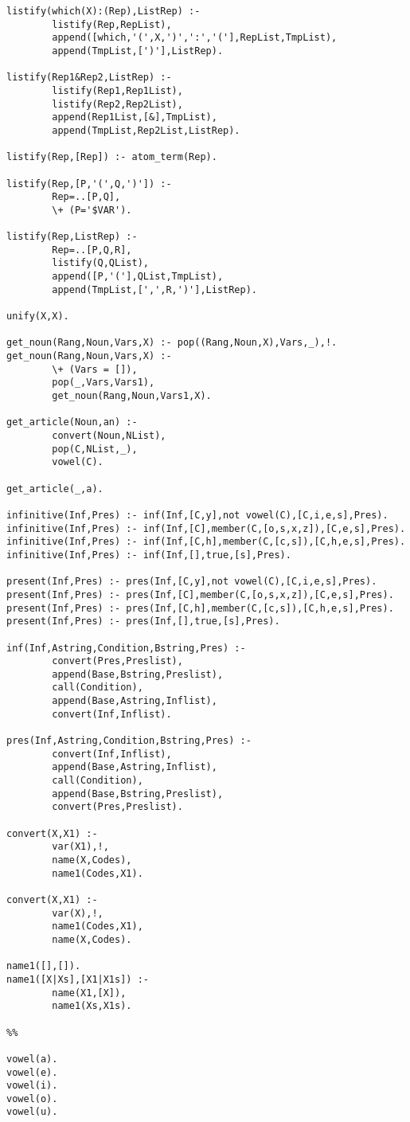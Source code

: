 \begin{verbatim}
listify(which(X):(Rep),ListRep) :-
        listify(Rep,RepList),
        append([which,'(',X,')',':','('],RepList,TmpList),
        append(TmpList,[')'],ListRep).

listify(Rep1&Rep2,ListRep) :-
        listify(Rep1,Rep1List),
        listify(Rep2,Rep2List),
        append(Rep1List,[&],TmpList),
        append(TmpList,Rep2List,ListRep).

listify(Rep,[Rep]) :- atom_term(Rep).

listify(Rep,[P,'(',Q,')']) :- 
        Rep=..[P,Q],
        \+ (P='$VAR').

listify(Rep,ListRep) :-
        Rep=..[P,Q,R],
        listify(Q,QList),
        append([P,'('],QList,TmpList),
        append(TmpList,[',',R,')'],ListRep).

unify(X,X).

get_noun(Rang,Noun,Vars,X) :- pop((Rang,Noun,X),Vars,_),!.
get_noun(Rang,Noun,Vars,X) :-
        \+ (Vars = []),
        pop(_,Vars,Vars1),
        get_noun(Rang,Noun,Vars1,X).

get_article(Noun,an) :-
        convert(Noun,NList),
        pop(C,NList,_),
        vowel(C).

get_article(_,a).

infinitive(Inf,Pres) :- inf(Inf,[C,y],not vowel(C),[C,i,e,s],Pres).
infinitive(Inf,Pres) :- inf(Inf,[C],member(C,[o,s,x,z]),[C,e,s],Pres).
infinitive(Inf,Pres) :- inf(Inf,[C,h],member(C,[c,s]),[C,h,e,s],Pres).
infinitive(Inf,Pres) :- inf(Inf,[],true,[s],Pres).

present(Inf,Pres) :- pres(Inf,[C,y],not vowel(C),[C,i,e,s],Pres).
present(Inf,Pres) :- pres(Inf,[C],member(C,[o,s,x,z]),[C,e,s],Pres).
present(Inf,Pres) :- pres(Inf,[C,h],member(C,[c,s]),[C,h,e,s],Pres).
present(Inf,Pres) :- pres(Inf,[],true,[s],Pres).

inf(Inf,Astring,Condition,Bstring,Pres) :-
        convert(Pres,Preslist),
        append(Base,Bstring,Preslist),
        call(Condition),
        append(Base,Astring,Inflist),
        convert(Inf,Inflist).

pres(Inf,Astring,Condition,Bstring,Pres) :-
        convert(Inf,Inflist),
        append(Base,Astring,Inflist),
        call(Condition),
        append(Base,Bstring,Preslist),
        convert(Pres,Preslist).

convert(X,X1) :-
        var(X1),!,
        name(X,Codes),
        name1(Codes,X1).

convert(X,X1) :-
        var(X),!,
        name1(Codes,X1),
        name(X,Codes).

name1([],[]).
name1([X|Xs],[X1|X1s]) :-
        name(X1,[X]),
        name1(Xs,X1s).

%%

vowel(a).
vowel(e).
vowel(i).
vowel(o).
vowel(u).
\end{verbatim}
